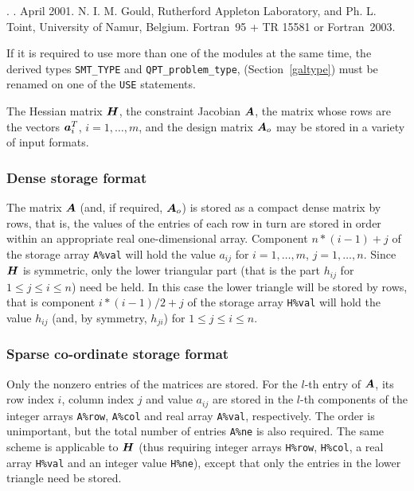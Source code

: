 \documentclass{galahad}
\newcommand{\packagename}{QPT}
\newcommand{\fullpackagename}{\libraryname\_\packagename}
\begin{document}
\galattributes
\galversions{\tt  \fullpackagename\_single, \fullpackagename\_double}.
.
\galdate April 2001.
\galorigin N. I. M. Gould, Rutherford Appleton Laboratory, and
Ph. L. Toint, University of Namur, Belgium.
\gallanguage Fortran~95 + TR 15581 or Fortran~2003.


\galhowto



\noindent
If it is required to use more than one of the modules at the same time, 
the derived types
{\tt SMT\_TYPE}
and
{\tt QPT\_problem\_type},
(Section~\ref{galtype})
must be renamed on one of the {\tt USE} statements.


\galmatrix
The Hessian matrix ${\bm{H}}$,
the constraint Jacobian ${\bm{A}}$, the matrix
whose rows are the vectors ${\bm{a}}_{i}^{T}$, $i = 1, \ldots , m$,
and the design matrix ${\bm{A}}_o$
may be stored in a variety of input formats.

\subsubsection{Dense storage format}\label{dense}
The matrix ${\bm{A}}$ (and, if required, ${\bm{A}}_o$) is stored as a compact
dense matrix by rows, that is, the values of the entries of each row in turn are
stored in order within an appropriate real one-dimensional array.
Component $n \ast (i-1) + j$ of the storage array {\tt A\%val} will hold the
value $a_{ij}$ for $i = 1, \ldots , m$, $j = 1, \ldots , n$.
Since ${\bm{H}}$ is symmetric, only the lower triangular part (that is the part
$h_{ij}$ for $1 \leq j \leq i \leq n$) need be held. In this case
the lower triangle will be stored by rows, that is
component $i \ast (i-1)/2 + j$ of the storage array {\tt H\%val}
will hold the value $h_{ij}$ (and, by symmetry, $h_{ji}$)
for $1 \leq j \leq i \leq n$.

\subsubsection{Sparse co-ordinate storage format}\label{coordinate}
Only the nonzero entries of the matrices are stored. For the
$l$-th entry of ${\bm{A}}$, its row index $i$, column index $j$
and value $a_{ij}$
are stored in the $l$-th components of the integer arrays {\tt A\%row},
{\tt A\%col} and real array {\tt A\%val}, respectively.
The order is unimportant, but the total
number of entries {\tt A\%ne} is also required.
The same scheme is applicable to
${\bm{H}}$ (thus requiring integer arrays {\tt H\%row}, {\tt H\%col}, a real array
{\tt H\%val} and an integer value {\tt H\%ne}),
except that only the entries in the lower triangle need be stored.
\end{document}
